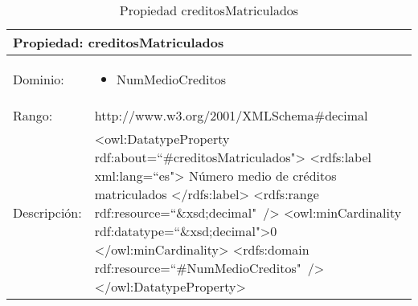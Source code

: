 \begin{table}[!ht]
	\centering
	\begin{tabular}{|p{}|p{}|}
		\hline
		\multicolumn{2}{|l|}{Propiedad: \textbf{creditosMatriculados}}
		\\ \hline
		Dominio:&
		\begin{itemize}
			\item NumMedioCreditos
		\end{itemize}
		\\ \hline
		Rango:&
		http://www.w3.org/2001/XMLSchema\#decimal
		\\ \hline
		Descripción:&
		\textless owl:DatatypeProperty rdf:about=``\#creditosMatriculados"\textgreater\newline 
		\tab\textless rdfs:label xml:lang=``es"\textgreater\newline
		\tab\tab Número medio de créditos matriculados\newline
		\tab\textless /rdfs:label\textgreater\newline
		\tab\textless rdfs:range\newline
		\tab\tab rdf:resource=``\&xsd;decimal"\ /\textgreater\newline
		\tab\textless owl:minCardinality \newline
		\tab\tab rdf:datatype=``\&xsd;decimal"\textgreater0\newline
		\tab\textless /owl:minCardinality\textgreater\newline
		\tab\textless rdfs:domain\newline
		\tab\tab rdf:resource=``\#NumMedioCreditos"\ /\textgreater\newline
		\textless /owl:DatatypeProperty\textgreater
		\\ \hline
	\end{tabular}
	\caption{Propiedad creditosMatriculados}
	\label{propiedad-creditosmatriculados}
\end{table}

